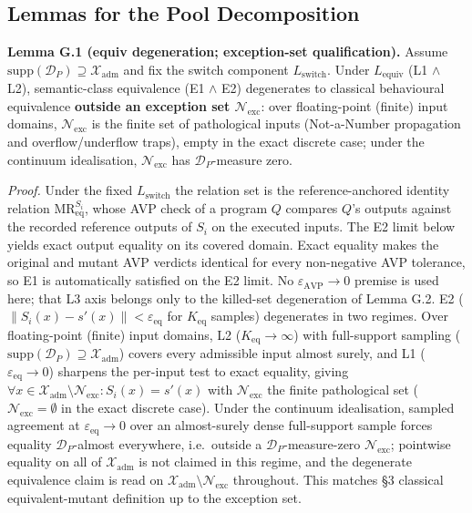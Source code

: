 \documentclass[review,12pt,authoryear]{elsarticle}
\begin{document}
\subsection{Lemmas for the Pool Decomposition}\label{g.3-lemmas-three-state-decomposition-degenerates-under-l}

\textbf{Lemma G.1 (equiv degeneration; exception-set
qualification).} Assume
$\mathrm{supp}(\mathcal{D}_P) \supseteq \mathcal{X}_{\mathrm{adm}}$ and
fix the switch component $L_{\mathrm{switch}}$. Under
$L_{\mathrm{equiv}}$ (L1 $\wedge$ L2), semantic-class equivalence
(E1 $\wedge$ E2) degenerates to classical behavioural equivalence
\textbf{outside an exception set $\mathcal{N}_{\mathrm{exc}}$}: over
floating-point (finite) input domains, $\mathcal{N}_{\mathrm{exc}}$ is
the finite set of pathological inputs (Not-a-Number propagation and
overflow/underflow traps), empty in the exact discrete case; under the
continuum idealisation, $\mathcal{N}_{\mathrm{exc}}$ has
$\mathcal{D}_P$-measure zero.

\emph{Proof.} Under the fixed $L_{\mathrm{switch}}$ the relation set is
the reference-anchored identity relation
$\mathrm{MR}_{\mathrm{eq}}^{S_i}$, whose AVP check of a program $Q$
compares $Q$'s outputs against the recorded reference outputs of $S_i$
on the executed inputs. The E2 limit below yields exact output equality
on its covered domain. Exact equality makes the original and mutant AVP
verdicts identical for every non-negative AVP tolerance, so E1 is
automatically satisfied on the E2 limit. No
$\varepsilon_{\mathrm{AVP}}\to0$ premise is used here; that L3 axis
belongs only to the killed-set degeneration of Lemma G.2. E2
($\|S_i(x) - s'(x)\| < \varepsilon_{\mathrm{eq}}$ for $K_{\mathrm{eq}}$ samples)
degenerates in two regimes. Over floating-point (finite) input domains,
L2 ($K_{\mathrm{eq}} \to \infty$) with full-support sampling
($\mathrm{supp}(\mathcal{D}_P) \supseteq \mathcal{X}_{\mathrm{adm}}$)
covers every admissible input almost surely, and L1
($\varepsilon_{\mathrm{eq}} \to 0$) sharpens the per-input test to exact
equality, giving
$\forall x \in \mathcal{X}_{\mathrm{adm}} \setminus \mathcal{N}_{\mathrm{exc}}: S_i(x) = s'(x)$
with $\mathcal{N}_{\mathrm{exc}}$ the finite pathological set
($\mathcal{N}_{\mathrm{exc}} = \emptyset$ in the exact discrete case).
Under the continuum idealisation, sampled agreement at
$\varepsilon_{\mathrm{eq}} \to 0$ over an almost-surely dense
full-support sample forces equality $\mathcal{D}_P$-almost everywhere,
i.e.\ outside a $\mathcal{D}_P$-measure-zero
$\mathcal{N}_{\mathrm{exc}}$; pointwise equality on all of
$\mathcal{X}_{\mathrm{adm}}$ is not claimed in this regime, and the
degenerate equivalence claim is read on
$\mathcal{X}_{\mathrm{adm}} \setminus \mathcal{N}_{\mathrm{exc}}$
throughout. This matches \citet{d7c38286734419b52de4262c9802ebdfcf4b9447} §3 classical
equivalent-mutant definition up to the exception set.
\end{document}
